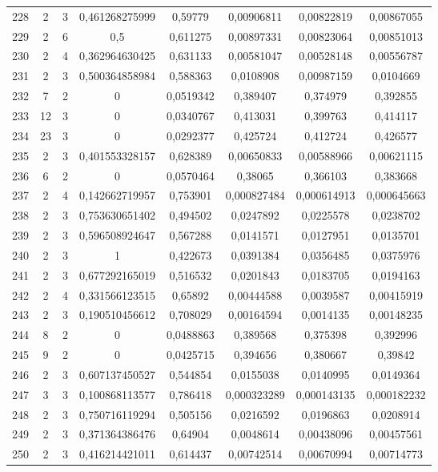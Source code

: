 \begin{longtable}{|c|c|c|c|c|c|c|c|}
228 & 2 & 3 & 0,461268275999 & 0,59779 & 0,00906811 & 0,00822819 & 0,00867055  \\
229 & 2 & 6 & 0,5 & 0,611275 & 0,00897331 & 0,00823064 & 0,00851013  \\
230 & 2 & 4 & 0,362964630425 & 0,631133 & 0,00581047 & 0,00528148 & 0,00556787  \\
231 & 2 & 3 & 0,500364858984 & 0,588363 & 0,0108908 & 0,00987159 & 0,0104669  \\
232 & 7 & 2 & 0 & 0,0519342 & 0,389407 & 0,374979 & 0,392855  \\
233 & 12 & 3 & 0 & 0,0340767 & 0,413031 & 0,399763 & 0,414117  \\
234 & 23 & 3 & 0 & 0,0292377 & 0,425724 & 0,412724 & 0,426577  \\
235 & 2 & 3 & 0,401553328157 & 0,628389 & 0,00650833 & 0,00588966 & 0,00621115  \\
236 & 6 & 2 & 0 & 0,0570464 & 0,38065 & 0,366103 & 0,383668  \\
237 & 2 & 4 & 0,142662719957 & 0,753901 & 0,000827484 & 0,000614913 & 0,000645663  \\
238 & 2 & 3 & 0,753630651402 & 0,494502 & 0,0247892 & 0,0225578 & 0,0238702  \\
239 & 2 & 3 & 0,596508924647 & 0,567288 & 0,0141571 & 0,0127951 & 0,0135701  \\
240 & 2 & 3 & 1 & 0,422673 & 0,0391384 & 0,0356485 & 0,0375976  \\
241 & 2 & 3 & 0,677292165019 & 0,516532 & 0,0201843 & 0,0183705 & 0,0194163  \\
242 & 2 & 4 & 0,331566123515 & 0,65892 & 0,00444588 & 0,0039587 & 0,00415919  \\
243 & 2 & 3 & 0,190510456612 & 0,708029 & 0,00164594 & 0,0014135 & 0,00148235  \\
244 & 8 & 2 & 0 & 0,0488863 & 0,389568 & 0,375398 & 0,392996  \\
245 & 9 & 2 & 0 & 0,0425715 & 0,394656 & 0,380667 & 0,39842  \\
246 & 2 & 3 & 0,607137450527 & 0,544854 & 0,0155038 & 0,0140995 & 0,0149364  \\
247 & 3 & 3 & 0,100868113577 & 0,786418 & 0,000323289 & 0,000143135 & 0,000182232  \\
248 & 2 & 3 & 0,750716119294 & 0,505156 & 0,0216592 & 0,0196863 & 0,0208914  \\
249 & 2 & 3 & 0,371364386476 & 0,64904 & 0,0048614 & 0,00438096 & 0,00457561  \\
250 & 2 & 3 & 0,416214421011 & 0,614437 & 0,00742514 & 0,00670994 & 0,00714773  \\

\end{longtable}
